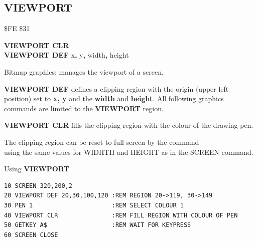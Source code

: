 \subsection{VIEWPORT}
\begin{description}[leftmargin=2cm,style=nextline]
\item [Token:] \$FE \$31
\item [Format:] {\bf VIEWPORT CLR} \\
		{\bf VIEWPORT DEF} x{\bf,} y{\bf,} width{\bf,} height
\item [Usage:] Bitmap graphics: manages the viewport of a screen.

               {\bf VIEWPORT DEF} defines a clipping region with the origin
               (upper left position) set to {\bf x, y} and the {\bf width}
               and {\bf height}.
               All following graphics commands are limited to the {\bf VIEWPORT}
               region.

               {\bf VIEWPORT CLR} fills the clipping region
               with the colour of the drawing pen.

\item [Remarks:] The clipping region can be reset to full screen by the command\\
                using the same values for WIDHTH and HEIGHT as in the SCREEN command.

\item [Example:] Using {\bf VIEWPORT}
\begin{tcolorbox}[colback=black,coltext=white]
\verbatimfont{\codefont}
\begin{verbatim}
10 SCREEN 320,200,2
20 VIEWPORT DEF 20,30,100,120 :REM REGION 20->119, 30->149
30 PEN 1                      :REM SELECT COLOUR 1
40 VIEWPORT CLR               :REM FILL REGION WITH COLOUR OF PEN
50 GETKEY A$                  :REM WAIT FOR KEYPRESS
60 SCREEN CLOSE
\end{verbatim}
\end{tcolorbox}
\end{description}


\newpage
